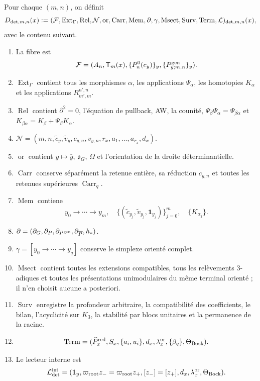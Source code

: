 Pour chaque \((m,n)\), on définit
\begin{equation}\label{eq:detint-d-trece}
 D_{{\rm det},m,n}(x):=
 (\mathcal F,\operatorname{Ext}_\Gamma,\operatorname{Rel},
 \mathcal N,\operatorname{or},\operatorname{Carr},\operatorname{Mem},
 \partial,\gamma,\operatorname{Msect},\operatorname{Surv},
 \operatorname{Term},\mathcal L)_{{\rm det},m,n}(x),
\end{equation}
avec le contenu suivant.
\begin{enumerate}
 \item La fibre est
 \[
  \mathcal F=(A_n,\mathsf T_m(x),
  \{P_n^0(c_y)\}_y,\{P^{\rm gen}_{y;m,n}\}_y).
 \]
 \item \(\operatorname{Ext}_\Gamma\) contient tous les morphismes
 \(\alpha\), les applications \(\Psi_\alpha\), les homotopies \(K_\alpha\) et
 les applications \(R_{m',m}^{n',n}\).
 \item \(\operatorname{Rel}\) contient \(\partial^2=0\), l'équation de
 pullback, AW, la counité, \(\Psi_\beta\Psi_\alpha=\Psi_{\beta\alpha}\) et
 \(K_{\beta\alpha}=K_\beta+\Psi_\beta K_\alpha\).
 \item
 \(\mathcal N=(m,n,\widetilde c_y,\widetilde v_y,c_{y,n},v_{y,n},
 r_x,a_1,\ldots,a_{r_x},d_x)\).
 \item \(\operatorname{or}\) contient \(y\mapsto\bar y\),
 \(\mathfrak o_G\), \(\Omega\) et l'orientation de la droite
 déterminantielle.
 \item \(\operatorname{Carr}\) conserve séparément la retenue entière,
 sa réduction \(c_{y,n}\) et toutes les retenues supérieures
 \(\operatorname{Carr}_q\).
 \item \(\operatorname{Mem}\) contiene
 \[
  y_0\to\cdots\to y_m,
  \quad\{(\widetilde c_{y_j},\widetilde v_{y_j},\mathbf1_{y_j})\}_{j=0}^m,
  \quad\{K_{\alpha_j}\}.
 \]
 \item
 \(\partial=(\partial_G,\partial_P,\partial_{P^{\rm gen}},
 \partial_{\overline P},h_*)\).
 \item \(\gamma=[y_0\to\cdots\to y_q]\) conserve le simplexe orienté
 complet.
 \item \(\operatorname{Msect}\) contient toutes les extensions
 compatibles, tous les relèvements \(3\)-adiques et toutes les présentations
 unimodulaires du même terminal orienté ; il n'en choisit aucune a posteriori.
 \item \(\operatorname{Surv}\) enregistre la profondeur arbitraire,
 la compatibilité des coefficients, le bilan, l'acyclicité sur \(K_3\),
 la stabilité par blocs unitaires et la permanence de la racine.
 \item
 \[
  \operatorname{Term}=(\widehat P_x^{\rm red},S_x,
  \{a_i,u_i\},d_x,\lambda_x^{\rm or},
  \{\beta_q\},\Theta_{\rm Bock}).
 \]
 \item Le lecteur interne est
 \[
  \mathcal L_{\rm det}^{\rm int}
  =(\mathbf1_y,
  \varpi_{\rm root}z_-=\varpi_{\rm root}z_+,
  [z_-]=[z_+],d_x,\lambda_x^{\rm or},\Theta_{\rm Bock}).
 \]
\end{enumerate}

